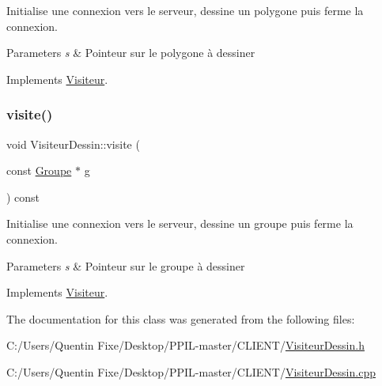 Initialise une connexion vers le serveur, dessine un polygone puis ferme la connexion. 


\begin{DoxyParams}{Parameters}
{\em s} & Pointeur sur le polygone à dessiner \\
\hline
\end{DoxyParams}


Implements \hyperlink{class_visiteur_a0a7c596d84a8750e3a670330a1001538}{Visiteur}.

\mbox{\label{class_visiteur_dessin_a295e7bd446e4650257d0cb8c4d8c9ec5}} 
\subsubsection{\texorpdfstring{visite()}{visite()}\hspace{0.1cm}{\footnotesize\ttfamily [5/5]}}
{\footnotesize\ttfamily void Visiteur\+Dessin\+::visite (\begin{DoxyParamCaption}\item[{const \hyperlink{class_groupe}{Groupe} $\ast$}]{g }\end{DoxyParamCaption}) const\hspace{0.3cm}{\ttfamily [virtual]}}



Initialise une connexion vers le serveur, dessine un groupe puis ferme la connexion. 


\begin{DoxyParams}{Parameters}
{\em s} & Pointeur sur le groupe à dessiner \\
\hline
\end{DoxyParams}


Implements \hyperlink{class_visiteur_a812aa03fad51d8aec386f8df7f9b5353}{Visiteur}.



The documentation for this class was generated from the following files\+:\begin{DoxyCompactItemize}
\item 
C\+:/\+Users/\+Quentin Fixe/\+Desktop/\+P\+P\+I\+L-\/master/\+C\+L\+I\+E\+N\+T/\hyperlink{_visiteur_dessin_8h}{Visiteur\+Dessin.\+h}\item 
C\+:/\+Users/\+Quentin Fixe/\+Desktop/\+P\+P\+I\+L-\/master/\+C\+L\+I\+E\+N\+T/\hyperlink{_visiteur_dessin_8cpp}{Visiteur\+Dessin.\+cpp}\end{DoxyCompactItemize}
